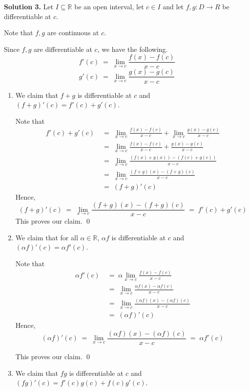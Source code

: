 \documentclass[10pt]{article}
\begin{document}
	\textbf{Solution 3.}
	Let $I \subseteq \mathbb{R}$ be an open interval, let $c \in I$ and let $f, g\colon D \to R$ be differentiable at $c$.
	
	Note that $f, g$ are continuous at $c$.
	
	Since $f, g$ are differentiable at $c$, we have the following.
	\[f'(c) \;=\; \lim_{x \to c} \frac{f(x) - f(c)}{x - c}\]
	\[g'(c) \;=\; \lim_{x \to c} \frac{g(x) - g(c)}{x - c}\]
	\begin{enumerate}
		\item We claim that $f + g$ is differentiable at $c$ and $(f + g)'(c) = f'(c) + g'(c)$.
		
		Note that
		\begin{align*}
			f'(c) + g'(c) \;&=\; \lim_{x \to c} \frac{f(x) - f(c)}{x - c} + \lim_{x \to c} \frac{g(x) - g(c)}{x - c} \\
			\;&=\; \lim_{x \to c} \frac{f(x) - f(c)}{x - c} + \frac{g(x) - g(c)}{x - c} \\
			\;&=\; \lim_{x \to c} \frac{(f(x) + g(x)) - (f(c) + g(c))}{x - c} \\
			\;&=\; \lim_{x \to c} \frac{(f + g)(x) - (f + g)(c)}{x - c} \\
			\;&=\; (f + g)'(c)
		\end{align*}
		Hence,
		\[
		(f + g)'(c) \;=\; \lim_{x \to c} \frac{(f + g)(x) - (f + g)(c)}{x - c} \;=\; f'(c) + g'(c)
		\]
		This proves our claim. \qed
		
		\item We claim that for all $\alpha \in \mathbb{R}$, $\alpha f$ is differentiable at $c$ and $(\alpha f)'(c) = \alpha f'(c)$.
		
		Note that
		\begin{align*}
			\alpha f'(c) \;&=\; \alpha \lim_{x \to c} \frac{f(x) - f(c)}{x - c} \\
			\;&=\; \lim_{x \to c} \frac{\alpha f(x) - \alpha f(c)}{x - c} \\
			\;&=\; \lim_{x \to c} \frac{(\alpha f)(x) - (\alpha f)(c)}{x - c} \\
			\;&=\; (\alpha f)'(c)
		\end{align*}
		Hence,
		\[
		(\alpha f)'(c) \;=\; \lim_{x \to c} \frac{(\alpha f)(x) - (\alpha f)(c)}{x - c} \;=\; \alpha f'(c)
		\]
		
		This proves our claim. \qed
		
		\item We claim that $fg$ is differentiable at $c$ and $(fg)'(c) = f'(c)g(c) + f(c)g'(c)$.
		

\end{enumerate}
\end{document}
